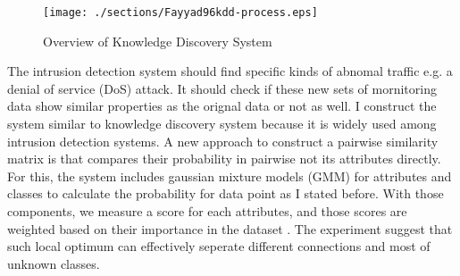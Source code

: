 \begin{figure}[htb2]
\begin{center}
\texttt{[image: ./sections/Fayyad96kdd-process.eps]}
\end{center}
\caption{Overview of Knowledge Discovery System}
\label{fig:refSingleRobot1}
\end{figure}
The intrusion detection system should find specific kinds of abnomal traffic e.g. a denial of service (DoS) attack. 
It should check if these new sets of mornitoring data show similar properties as the orignal data or not as well. 
I construct the system similar to knowledge discovery system \cite{fayyad96} because it is widely used among intrusion detection systems. 
A new approach to construct a pairwise similarity matrix is that compares their probability in pairwise not its attributes directly. 
For this, the system includes gaussian mixture models (GMM) for attributes and classes to calculate the probability for data point as I stated before. 
With those components, we measure a score for each attributes, and those scores are weighted based on their importance in the dataset \cite{kayacik05}.
The experiment suggest that such local optimum can effectively seperate different connections and most of unknown classes. 


